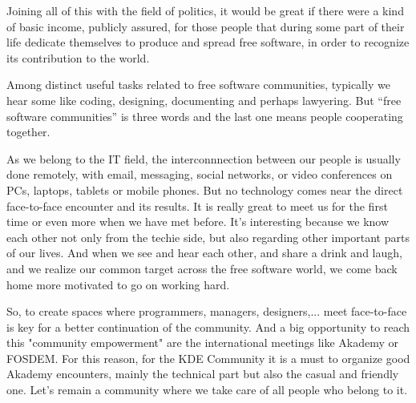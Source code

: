 Joining all of this with the field of politics, it would be great if there were a kind of basic income, publicly assured, for those people that during some part of their life dedicate themselves to produce and spread free software, in order to recognize its contribution to the world.

Among distinct useful tasks related to free software communities, typically we hear some like coding, designing, documenting and perhaps lawyering. But ``free software communities'' is three words and the last one means people cooperating together.

As we belong to the IT field, the interconnnection between our people is usually done remotely, with email, messaging, social networks, or video conferences on PCs, laptops, tablets or mobile phones. But no technology comes near the direct face-to-face encounter and its results. It is really great to meet us for the first time or even more when we have met before. It's interesting because we know each other not only from the techie side, but also regarding other important parts of our lives. And when we see and hear each other, and share a drink and laugh, and we realize our common target across the free software world, we come back home more motivated to go on working hard.

So, to create spaces where programmers, managers, designers,... meet face-to-face is key for a better continuation of the community. And a big opportunity to reach this "community empowerment" are the international meetings like Akademy or FOSDEM. For this reason, for the KDE Community it is a must to organize good Akademy encounters, mainly the technical part but also the casual and friendly one. Let's remain a community where we take care of all people who belong to it.
